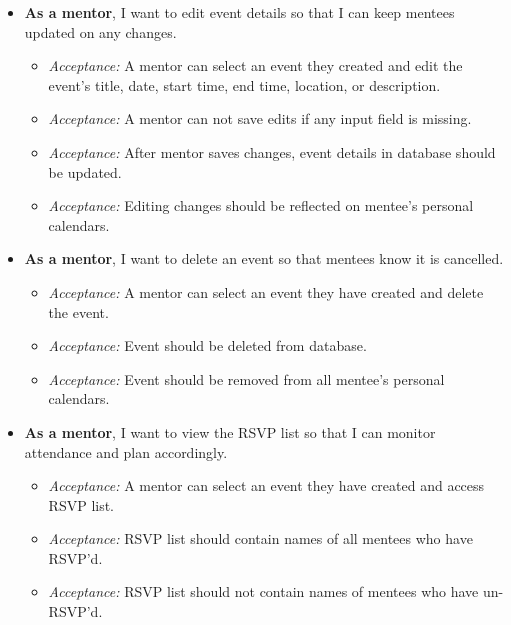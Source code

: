 \begin{itemize}[leftmargin=*, label=$\square$]
    \item \textbf{As a mentor}, I want to edit event details so that I can keep
    mentees updated on any changes.
    \begin{itemize}[label=$\circ$, nosep]
        \item \textit{Acceptance:} A mentor can select an event they created and
        edit the event's title, date, start time, end time, location, or
        description.
        \item \textit{Acceptance:} A mentor can not save edits if any input
        field is missing.
        \item \textit{Acceptance:} After mentor saves changes, event details in
        database should be updated.
        \item \textit{Acceptance:} Editing changes should be reflected on
        mentee's personal calendars.
    \end{itemize}

    \item \textbf{As a mentor}, I want to delete an event so that mentees know
    it is cancelled.
    \begin{itemize}[label=$\circ$, nosep]
        \item \textit{Acceptance:} A mentor can select an event they have
        created and delete the event.
        \item \textit{Acceptance:} Event should be deleted from database.
        \item \textit{Acceptance:} Event should be removed from all mentee's
        personal calendars.
    \end{itemize}

    \item \textbf{As a mentor}, I want to view the RSVP list so that I can
    monitor attendance and plan accordingly.
    \begin{itemize}[label=$\circ$, nosep]
        \item \textit{Acceptance:} A mentor can select an event they have
        created and access RSVP list.
        \item \textit{Acceptance:} RSVP list should contain names of all mentees
        who have RSVP'd.
        \item \textit{Acceptance:} RSVP list should not contain names of mentees
        who have un-RSVP'd.
    \end{itemize}
\end{itemize}
